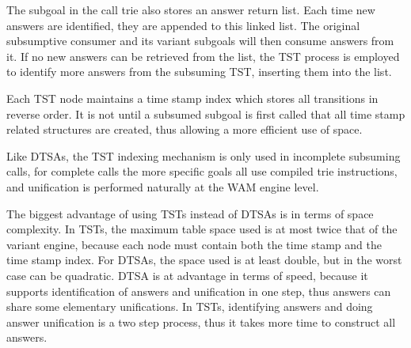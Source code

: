 The subgoal in the call trie also stores an answer return list. Each time new answers are identified, they are appended
to this linked list. The original subsumptive consumer and its variant subgoals will then consume answers from it. If no
new answers can be retrieved from the list, the TST process is employed to identify more answers from the subsuming TST,
inserting them into the list.

Each TST node maintains a time stamp index which stores all transitions in reverse order.
It is not until a subsumed subgoal is first called that all time stamp related structures are created, thus
allowing a more efficient use of space.

Like DTSAs, the TST indexing mechanism is only used in incomplete subsuming calls, for complete calls
the more specific goals all use compiled trie instructions, and unification is performed naturally at
the WAM engine level.

The biggest advantage of using TSTs instead of DTSAs is in terms of space complexity. In TSTs, the maximum table space
used is at most twice that of the variant engine, because each node must contain both the time stamp and the time stamp index.
For DTSAs, the space used is at least double, but in the worst
case can be quadratic. DTSA is at advantage in terms of speed, because it supports identification of answers and
unification in one step, thus answers can share some elementary unifications. In TSTs, identifying answers
and doing answer unification is a two step process, thus it takes more time to construct all answers. 
